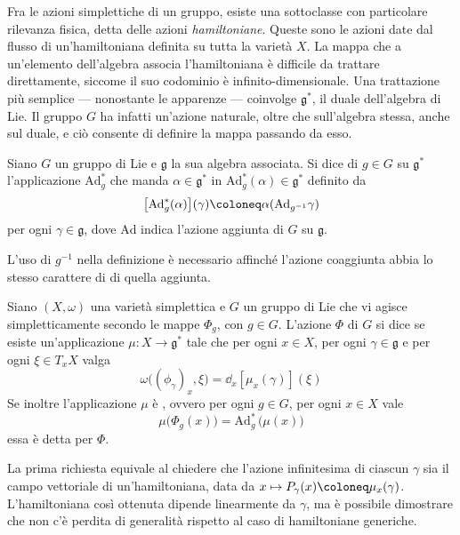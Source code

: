 Fra le azioni simplettiche di un gruppo, esiste una sottoclasse con particolare rilevanza fisica, detta delle azioni \emph{hamiltoniane}. Queste sono le azioni date dal flusso di un'hamiltoniana definita su tutta la varietà $X$. La mappa che a un'elemento dell'algebra associa l'hamiltoniana è difficile da trattare direttamente, siccome il suo codominio è infinito-dimensionale. Una trattazione più semplice --- nonostante le apparenze --- coinvolge $\mathfrak{g}^*$, il duale dell'algebra di Lie. Il gruppo $G$ ha infatti un'azione naturale, oltre che sull'algebra stessa, anche sul duale, e ciò consente di definire la mappa passando da esso.
\begin{definition}
  Siano $G$ un gruppo di Lie e $\mathfrak{g}$ la sua algebra associata. Si dice  di $g \in G$ su $\mathfrak{g}^*$ l'applicazione $\mathrm{Ad}_g^*$ che manda $\alpha \in \mathfrak{g}^*$ in $\mathrm{Ad}^*_g(\alpha) \in \mathfrak{g}^*$ definito da
  \begin{equation}
  \big[\mathrm{Ad}^*_g(\alpha)\big](\gamma) \defeq \alpha(\mathrm{Ad}_{g^{-1}}\gamma)
  \end{equation}
  per ogni $\gamma \in \mathfrak{g}$, dove $\mathrm{Ad}$ indica l'azione aggiunta di $G$ su $\mathfrak{g}$.
\end{definition}
\begin{remark}
  L'uso di $g^{-1}$ nella definizione è necessario affinché l'azione coaggiunta abbia lo stesso carattere di  di quella aggiunta.
\end{remark}
\begin{definition}
  Siano $(X, \omega)$ una varietà simplettica e $G$ un gruppo di Lie che vi agisce simpletticamente secondo le mappe $\Phi_g$, con $g \in G$. L'azione $\Phi$ di $G$ si dice  se esiste un'applicazione $\mu: X \to \mathfrak{g}^*$ tale che per ogni $x \in X$, per ogni $\gamma \in \mathfrak{g}$ e per ogni $\xi \in T_x X$ valga
  \begin{equation}
  \omega\big((\phi_{\gamma})_x, \xi\big) = \dd_x [\mu_x(\gamma)](\xi)
  \end{equation} 
  Se inoltre l'applicazione $\mu$ è , ovvero per ogni $g \in G$, per ogni $x \in X$ vale
  \begin{equation}
  \mu\big(\Phi_g(x)\big) = \mathrm{Ad}_g^*\, \big(\mu(x)\big)
  \end{equation} 
  essa è detta  per $\Phi$.
\end{definition}
\begin{remark}
  La prima richiesta equivale al chiedere che l'azione infinitesima di ciascun $\gamma$ sia il campo vettoriale di un'hamiltoniana, data da $x \mapsto P_{\gamma}(x) \defeq \mu_x(\gamma)$. L'hamiltoniana così ottenuta dipende linearmente da $\gamma$, ma è possibile dimostrare che non c'è perdita di generalità rispetto al caso di hamiltoniane generiche.
\end{remark}
